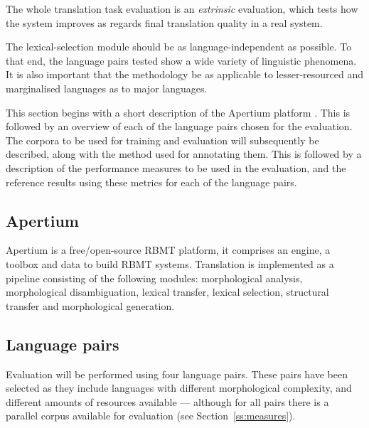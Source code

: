 \documentclass[11pt]{article}
\begin{document}
The
whole translation task evaluation is an \emph{extrinsic} evaluation, which
tests how the system improves as regards final translation
quality in a real system.

The lexical-selection module should be as language-independent as
possible. To that end, the language pairs tested show a wide
variety of linguistic phenomena. It is also important that the
methodology be as applicable to lesser-resourced and marginalised
languages as to major languages.

This section begins with a short description of the Apertium 
platform \citep{forcada2011apertium}. This is followed by 
an overview of each of the language
pairs chosen for the evaluation. The corpora to be used for training
and evaluation will subsequently be described, along with the method
used for annotating them. This is followed by a description of the
performance measures to be used in the evaluation, and the reference
results using these metrics for each of the language pairs.

\subsection{Apertium}
\label{sec:apertium}

Apertium is a free/open-source RBMT platform, it comprises an engine,
a toolbox and data to build RBMT systems. Translation is implemented
as a pipeline consisting of the following modules: morphological
analysis, morphological disambiguation, lexical transfer, lexical
selection, structural transfer and morphological generation. 

\subsection{Language pairs}
\label{sec:eval-systems}

Evaluation will be performed using four language pairs. These pairs
have been selected as they include languages with different
morphological complexity, and different amounts of resources available
--- although for all pairs there is a parallel corpus available
for evaluation (see Section~\ref{ss:measures}). 
\end{document}
